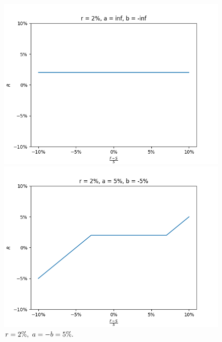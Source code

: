 \documentclass[10pt]{article}
\begin{document}
\begin{figure}[!htb]
  \includegraphics[width=\linewidth]{./plots/r_0.02_a_inf_b_-inf_c_inf_d_-inf_k_1.png}
  \caption{$\\r=2\%,\ a=-b=\infty.$}\label{fig:clamp1}
\endminipage\hfill
{}
  \includegraphics[width=\linewidth]{./plots/r_0.02_a_0.05_b_-0.05_c_inf_d_-inf_k_1.png}
  \caption{$\\r=2\%,\ a=-b=5\%.$}\label{fig:clamp22}
\endminipage\hfill
{}%

\end{figure}
\end{document}
